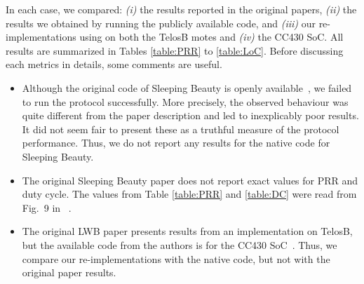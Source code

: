 In each case, we compared: \emph{(i)} the results reported in the original papers, \emph{(ii)} the results we obtained by running the publicly available code, and \emph{(iii)} our re-implementations using \baloo on both the TelosB motes and \emph{(iv)} the CC430 SoC.
All results are summarized in Tables \ref{table:PRR} to \ref{table:LoC}. Before discussing each metrics in details, some comments are useful.
\begin{itemize}

	\item
	Although the original code of Sleeping Beauty is openly available~\cite{Code_SleepingBeauty}, we failed to run the protocol successfully. More precisely, the observed behaviour was quite different from the paper description and led to inexplicably poor results.
	It did not seem fair to present these as a truthful measure of the protocol performance.
	Thus, we do not report any results for the native code for Sleeping Beauty.

	\item
	The original Sleeping Beauty paper does not report exact values for PRR and duty cycle. The values from Table \ref{table:PRR} and \ref{table:DC} were read from Fig.~9 in ~\cite{sarkar2016Sleeping}.

	\item
	The original LWB paper presents results from an implementation on TelosB, but the available code from the authors is for the CC430 SoC~\cite{Code_LWB}.
	Thus, we compare our re-implementations with the native code, but not with the original paper results.

\end{itemize}


